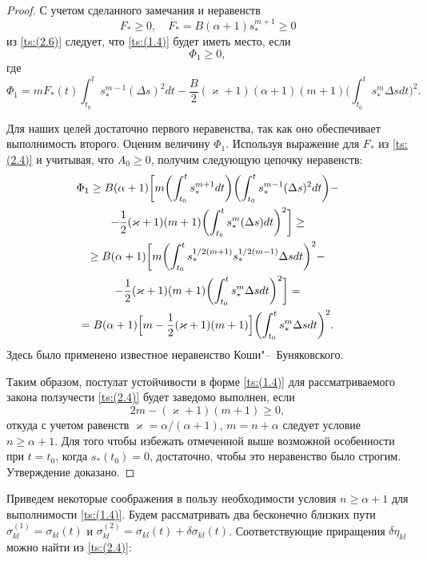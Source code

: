 \begin{proof}
С учетом сделанного замечания и неравенств 
$$F_{*}\geqslant0, \quad \dot{F_{*}}=B(\alpha+1)s_{*}^{m+1}\geq0
$$ из \eqref{ts:(2.6)}  следует, что \eqref{ts:(1.4)} будет иметь место, если
$$
\Phi_{1}\geq0,$$
где
$$
\Phi_{1}=mF_{*}(t)\int_{t_{0}}^{t}s_{*}^{m-1}(\Delta s)^{2}dt-\frac{B}{2}(\varkappa+1)(\alpha+1)(m+1)\biggl(\int_{t_{0}}^{t}s_{*}^{m}\Delta s dt\biggr)^{2}.
$$

Для наших целей достаточно первого неравенства, так как оно обеспечивает выполнимость второго. 
Оценим величину $\Phi_{1}$. 
Используя выражение для $F_{*}$ из  \eqref{ts:(2.4)} и учитывая, что $A_{0}\geq0$, получим следующую цепочку неравенств:
\begin{multline}
\Phi_{1}\geq B(\alpha+1)\biggl[ m\biggl( \int_{t_{0}}^{t}s_{*}^{m+1}dt\biggr) \biggl( \int_{t_{0}}^{t}s_{*}^{m-1}(\Delta s)^{2}dt\biggr) - 
\\
-\frac 12(\varkappa+1)(m+1)\biggl(\int_{t_{0}}^{t}s_{*}^{m}(\Delta s)dt\biggr)^{2}\biggr]\geq
\\
\geq B(\alpha+1)\biggl[ m\biggl(\int_{t_{0}}^{t}s_{*}^{1/2(m+1)}s_{*}^{1/2(m-1)}\Delta s dt\biggr)^{2}-
\\
-\frac{1}{2}(\varkappa+1)(m+1)\biggl(\int_{t_{0}}^{t}s_{*}^{m}\Delta s dt\biggr)^{2}\biggr]=
\\
=B(\alpha+1)\Bigl[ m-\frac{1}{2}(\varkappa+1)(m+1)\Bigr] \biggl( \int_{t_{0}}^{t}s_{*}^{m}\Delta s dt\biggr)^{2}.
\end{multline}
Здесь было применено известное неравенство Коши"--~Буняковского.

Таким образом, постулат устойчивости в форме \eqref{ts:(1.4)} для рассматриваемого закона ползучести \eqref{ts:(2.4)} будет заведомо выполнен, 
если 
$$
2m-(\varkappa+1)(m+1)\geq0,
$$ 
откуда с учетом равенств $\varkappa=\alpha/(\alpha+1)$, $ m=n+\alpha$ следует условие  $n\geq{\alpha+1}$. Для того чтобы избежать отмеченной выше возможной особенности при  $t=t_{0}$, когда $s_{*}(t_{0})=0$, достаточно, чтобы это неравенство было строгим. Утверждение доказано. \end{proof}

\smallskip

Приведем некоторые соображения в пользу необходимости условия \linebreak $n\geq{\alpha+1}$ для выполнимости \eqref{ts:(1.4)}. 
Будем рассматривать два бесконечно близких пути $\sigma_{kl}^{(1)}=\sigma_{kl}(t)$ и $\sigma_{kl}^{(2)}=\sigma_{kl}(t)+\delta\sigma_{kl}(t)$. 
Соответствующие приращения $\delta\eta_{kl}$ можно найти из \eqref{ts:(2.4)}:


